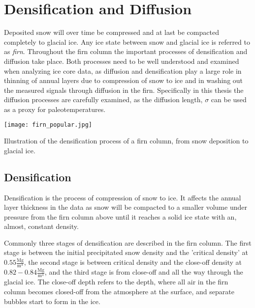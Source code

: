 \documentclass[../../CompleteThesis2/Complete_2ndDraft]{subfiles}
\begin{document}
\section[Densification and Diffusion][Densification and Diffusion]{Densification and Diffusion}
\label{Sec:Ice_DensificationAndDiffusion}
Deposited snow will over time be compressed and at last be compacted completely to glacial ice. Any ice state between snow and glacial ice is referred to as \textit{firn}. Throughout the firn column the important processes of densification and diffusion take place. Both processes need to be well understood and examined when analyzing ice core data, as diffusion and densification play a large role in thinning of annual layers due to compression of snow to ice and in washing out the measured signals through diffusion in the firn. Specifically in this thesis the diffusion processes are carefully examined, as the diffusion length, $\sigma$ can be used as a proxy for paleotemperatures.

\begin{marginfigure}
	\centering
	\texttt{[image: firn\_popular.jpg]}
	\caption[Densification process]{\footnotesize Illustration of the densification process of a firn column, from snow deposition to glacial ice.}
	\label{Fig:ICE_DENS_FirnColumn}
\end{marginfigure}

\subsection[Densification][Densification]{Densification}
\label{Subsec:Ice_DiffusionAndDensification_Densification}
Densification is the process of compression of snow to ice. It affects the annual layer thickness in the data as snow will be compacted to a smaller volume under pressure from the firn column above until it reaches a solid ice state with an, almost, constant density.

Commonly three stages of densification are described in the firn column. The first stage is between the initial precipitated snow density and the 'critical density' at $0.55 \frac{\text{Mg}}{\text{m}^3}$, the second stage is between critical density and the close-off density at $0.82-0.84 \frac{\text{Mg}}{\text{m}^3}$, and the third stage is from close-off and all the way through the glacial ice. The close-off depth refers to the depth, where all air in the firn column becomes closed-off from the atmosphere at the surface, and separate bubbles start to form in the ice.
\end{document}
